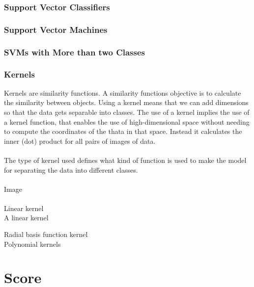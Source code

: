 \documentclass[11pt]{article}
\begin{document}
\subsubsection{Support Vector Classifiers}

\subsubsection{Support Vector Machines}

\subsubsection{SVMs with More than two Classes}

\subsubsection{Kernels}
Kernels are similarity functions. A similarity functions objective is to calculate the similarity between objects. Using a kernel means that we can add dimensions so that the data gets separable into classes. The use of a kernel implies the use of a kernel function, that enables the use of high-dimensional space without needing to compute the coordinates of the thata in that space. Instead it calculates the inner (dot) product for all pairs of images of data.\\
\\
The type of kernel used defines what kind of function is used to make the model for separating the data into different classes.\\
\\
Image\\
\\
\large{Linear kernel}\\
A linear kernel

\large{Radial basis function kernel}\\

\large{Polynomial kernels}

\section{Score}
\end{document}
